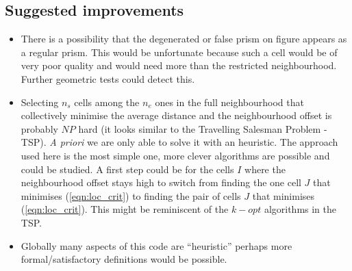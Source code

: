 \subsection{Suggested improvements}

\begin{itemize}

\item There is a possibility that the degenerated or false prism on figure
\label{fig:false_prism} appears as a regular prism. This would be unfortunate
because such a cell would be of very poor quality and would need more than the
restricted neighbourhood. Further geometric tests could detect this.

\item Selecting $n_s$ cells among the $n_e$ ones in the full neighbourhood that
collectively minimise the average distance and the neighbourhood offset is
probably $NP$ hard (it looks similar to the Travelling Salesman Problem - TSP).
\textit{A priori} we are only able to solve it with an heuristic. The
approach used here is the most simple one, more clever algorithms are
possible and could be studied. A first step could be for the cells $I$
where the neighbourhood offset stays high to switch from
finding the one cell $J$ that minimises (\ref{eqn:loc_crit}) to
finding the pair of cells $J$ that minimises (\ref{eqn:loc_crit}). This might
be reminiscent of the $k-opt$ algorithms in the TSP.

\item Globally many aspects of this code are ``heuristic'' perhaps more
formal/satisfactory definitions would be possible.

\end{itemize}
